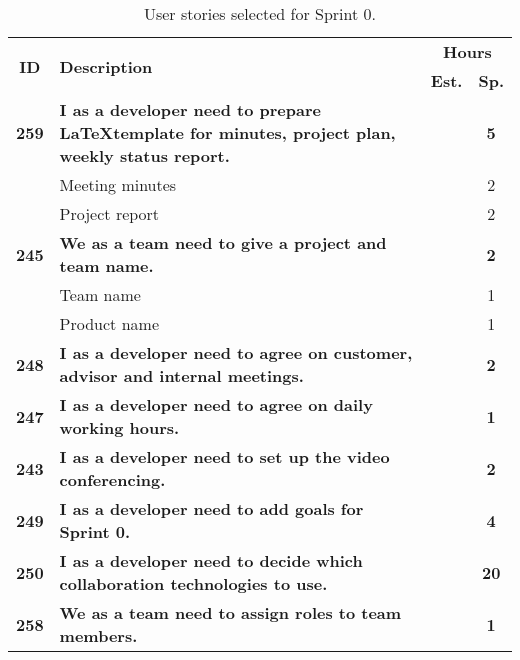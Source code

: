 \begin{table*}[!h]
\def\arraystretch{1.25}
\caption{User stories selected for Sprint 0. }
\label{tab:sprint0stories}

\begin{tabularx}{\textwidth}{cXcc} 

\toprule[1mm]
\multirow{2}{*}{\textbf{ID}} & \multirow{2}{*}{\textbf{Description}} & \multicolumn{2}{c}{\textbf{Hours}} \\
 					& & \textbf{Est.} & \textbf{Sp.} \\
\midrule
\textbf{259} 	& {\bf I as a developer need to prepare \LaTeX template for minutes, project plan, weekly status report.} 	& 			& \textbf{5} \\
				& \hspace{2em} Meeting minutes	&  & 2 \\
				& \hspace{2em} Project report 	&  & 2 \\

\textbf{245} 	& \textbf{We as a team need to give a project and team name.} 						& 			& \textbf{2} \\
				& \hspace{2em} Team name &  & 1 \\
				& \hspace{2em} Product name &  & 1 \\

\textbf{248} 	& \textbf{I as a developer need to agree on customer, advisor and internal meetings.} 						& 			& \textbf{2} \\

\textbf{247} 	& \textbf{I as a developer need to agree on daily working hours.} 						&  			& \textbf{1} \\

\textbf{243} 	& \textbf{I as a developer need to set up the video conferencing.} 						& 			& \textbf{2} \\

\textbf{249} 	& \textbf{I as a developer need to add goals for Sprint 0.} 						& 			& \textbf{4} \\

\textbf{250} 	& \textbf{I as a developer need to decide which collaboration technologies to use.} 						& 			& \textbf{20} \\

\textbf{258} 	& \textbf{We as a team need to assign roles to team members.} 						& 			& \textbf{1} \\


\end{tabularx}
\end{table*}
